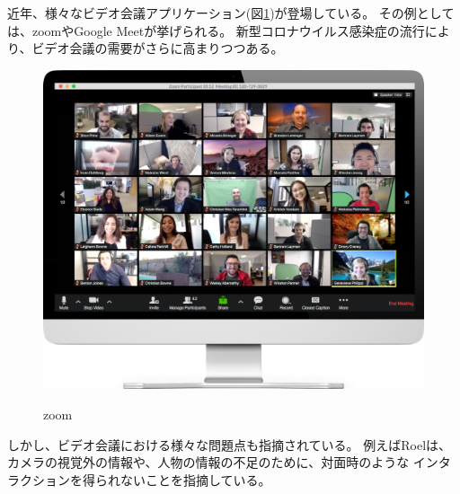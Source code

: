 近年、様々なビデオ会議アプリケーション(図\ref{fig:1})が登場している。
その例としては、zoom\cite{1}やGoogle Meet\cite{2}が挙げられる。
新型コロナウイルス感染症の流行により、ビデオ会議の需要がさらに高まりつつある。
\begin{figure}[tb]
  \centering
  \includegraphics[scale=0.5]{fig/zoom-monitor-screen.png}
  \caption{zoom}\label{fig:1}\cite{1}
\end{figure}

しかし、ビデオ会議における様々な問題点も指摘されている。
例えばRoel\cite{3}は、カメラの視覚外の情報や、人物の情報の不足のために、対面時のような
インタラクションを得られないことを指摘している。

